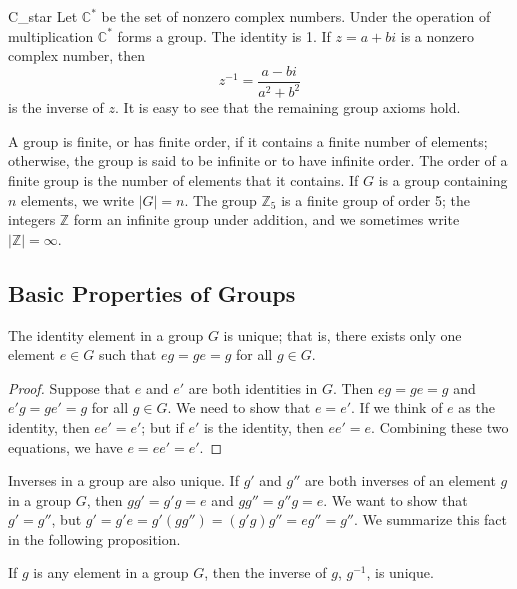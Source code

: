 
\begin{example}{C_star}
Let ${\mathbb C}^\ast$ be the set of nonzero complex 
numbers. Under the
operation of multiplication ${\mathbb C}^\ast$ forms a group.  The
identity is 1. If $z = a+bi$ is a nonzero complex number, then
\[
z^{-1} = \frac{a -bi}{a^2 +b^2}
\]
is the inverse of $z$.  It is easy to see that the remaining group
axioms hold. 
\end{example}
 
 

 
 
A group is {\bfi finite}, or has {\bfi finite
order}, if it contains a finite number of elements; otherwise, the
group is said to be {\bfi infinite\/} or to have {\bfi infinite
order}. The {\bfi order\/}
of a finite group is the number of elements that it contains. If $G$
is a group containing $n$ elements, we write $|G| =
n$\label{noteorder}. The group ${\mathbb Z}_5$ is a finite group of order
5; the integers ${\mathbb Z}$ form an infinite group under addition, and
we sometimes write $|{\mathbb Z}| = \infty$.
 
 
\subsection*{Basic Properties of Groups}
 
 
\begin{proposition}
The identity element in a group $G$ is unique; that is, there exists
only one element $e \in G$ such that $eg = ge = g$ for all $g \in G$. 
\end{proposition}
 
 
\begin{proof}
Suppose that $e$ and $e'$ are both identities in $G$. Then $eg = ge =
g$ and $e'g = ge' = g$ for all $g \in G$. We need to show that $e =
e'$. If we think of $e$ as the identity, then $ee' = e'$; but if $e'$
is the identity, then $ee' = e$. Combining these two equations, we
have $e = ee' = e'$. 
\end{proof}
 
 
\medskip
 
 
Inverses in a group are also unique. If $g'$ and $g''$ are both
inverses of an element $g$ in a group $G$, then $gg' = g'g = e$ and
$gg'' = g''g = e$. We want to show that $g' = g''$, but $g' = g'e =
g'(gg'') = (g'g)g'' = eg'' = g''$. We summarize this fact in the
following proposition. 
 
 
\begin{proposition}
If $g$ is any element in a group $G$, then the inverse of $g$,
$g^{-1}$, is unique. 
\end{proposition}
 
